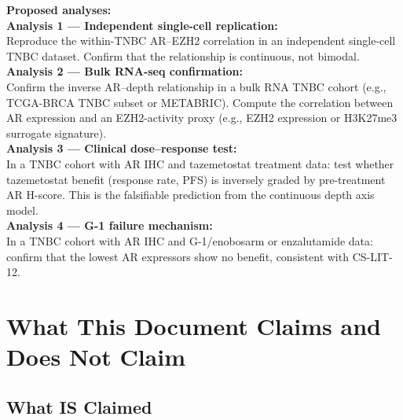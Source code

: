 \documentclass[12pt, a4paper]{article}
\begin{document}
\begin{center}
\colorbox{actionbox}{
\begin{minipage}{0.88\textwidth}
\vspace{0.5em}
\textbf{Proposed analyses:}\\[0.4em]
\textbf{Analysis 1 --- Independent single-cell
replication:}\\
Reproduce the within-TNBC AR--EZH2 correlation
in an independent single-cell TNBC dataset.
Confirm that the relationship is continuous,
not bimodal.\\[0.5em]
\textbf{Analysis 2 --- Bulk RNA-seq
confirmation:}\\
Confirm the inverse AR--depth relationship in
a bulk RNA TNBC cohort (e.g., TCGA-BRCA TNBC
subset or METABRIC). Compute the correlation
between AR expression and an EZH2-activity
proxy (e.g., EZH2 expression or H3K27me3
surrogate signature).\\[0.5em]
\textbf{Analysis 3 --- Clinical dose--response
test:}\\
In a TNBC cohort with AR IHC and tazemetostat
treatment data: test whether tazemetostat
benefit (response rate, PFS) is inversely
graded by pre-treatment AR H-score. This is
the falsifiable prediction from the continuous
depth axis model.\\[0.5em]
\textbf{Analysis 4 --- G-1 failure mechanism:}\\
In a TNBC cohort with AR IHC and G-1/enobosarm
or enzalutamide data: confirm that the lowest
AR expressors show no benefit, consistent with
CS-LIT-12.
\vspace{0.5em}
\end{minipage}}
\end{center}

\section{What This Document Claims and Does
Not Claim}

\subsection{What IS Claimed}
\end{document}

